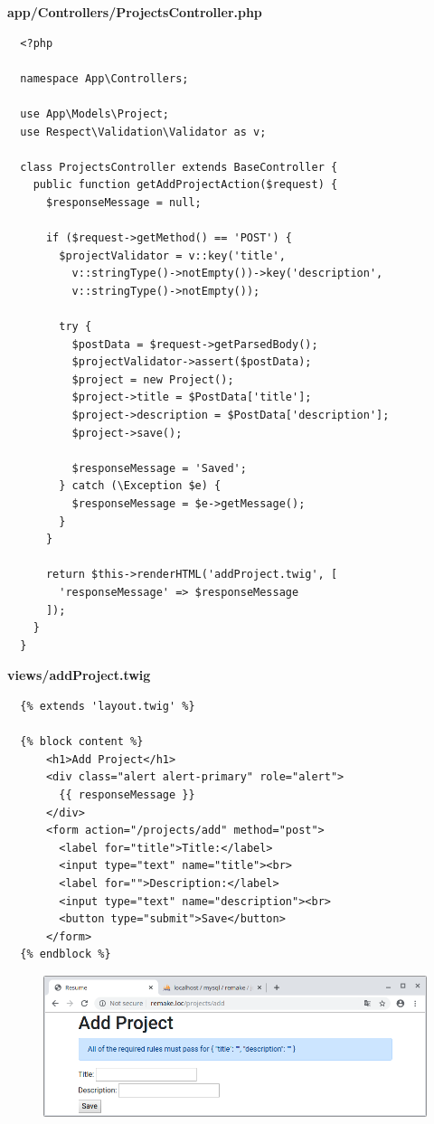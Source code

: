 \documentclass{article}
\begin{document}
\textbf{app/Controllers/ProjectsController.php}
\begin{verbatim}
  <?php

  namespace App\Controllers;

  use App\Models\Project;
  use Respect\Validation\Validator as v;

  class ProjectsController extends BaseController {
    public function getAddProjectAction($request) {
      $responseMessage = null;

      if ($request->getMethod() == 'POST') {
        $projectValidator = v::key('title',
          v::stringType()->notEmpty())->key('description',
          v::stringType()->notEmpty());

        try {
          $postData = $request->getParsedBody();
          $projectValidator->assert($postData);
          $project = new Project();
          $project->title = $PostData['title'];
          $project->description = $PostData['description'];
          $project->save();

          $responseMessage = 'Saved';
        } catch (\Exception $e) {
          $responseMessage = $e->getMessage();
        }
      }

      return $this->renderHTML('addProject.twig', [
        'responseMessage' => $responseMessage
      ]);
    }
  }
\end{verbatim}

\textbf{views/addProject.twig}
\begin{verbatim}
  {% extends 'layout.twig' %}

  {% block content %}
      <h1>Add Project</h1>
      <div class="alert alert-primary" role="alert">
        {{ responseMessage }}
      </div>
      <form action="/projects/add" method="post">
        <label for="title">Title:</label>
        <input type="text" name="title"><br>
        <label for="">Description:</label>
        <input type="text" name="description"><br>
        <button type="submit">Save</button>
      </form>
  {% endblock %}
\end{verbatim}

\begin{figure}[h!]
  \centering
  \includegraphics[scale=0.5]{./Pictures/172_jobs_err_empty_ok.png}
\end{figure}
\end{document}
